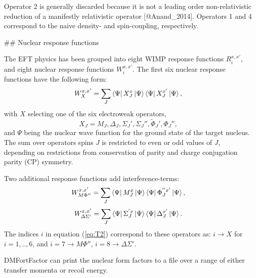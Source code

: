 Operator 2 is generally discarded because it is not a leading order
non-relativistic reduction of a manifestly relativistic operator
[@Anand_2014].  Operators 1 and 4 correspond to the naive density- and
spin-coupling, respectively.  

## Nuclear response functions

The EFT physics has been grouped into eight WIMP response functions
$R_i^{x,x'}$, and eight nuclear response functions $W_i^{x,x'}$.
The first six nuclear response functions have
the following form:
\begin{equation}
    W_{X}^{x,x'} = \sum_{J}\bra{\Psi} X^{x}_J \ket{\Psi}\bra{\Psi} X^{x'}_J \ket{\Psi},
\end{equation}
with $X$ selecting one of the six electroweak operators,
\begin{equation}
    X_J=M_J, \Delta_J, \Sigma_J', \Sigma_J'', \tilde{\Phi}_J', \Phi_J'',
\end{equation}
and $\Psi$ being the nuclear wave function for the ground state of the target
nucleus.  The sum over operators spins $J$ is restricted to even or odd values
of $J$, depending on restrictions from conservation of parity and charge
conjugation parity (CP) symmetry.

Two additional response functions add interference-terms:
\begin{equation}
W_{M\Phi''}^{x,x'} =
\sum_{J}\bra{\Psi} M_{J}^{x} \ket{\Psi}\bra{\Psi} \Phi_{J}^{''x'} \ket{\Psi},
\end{equation}
\begin{equation}
W_{\Delta\Sigma'}^{x,x'} = 
\sum_{J}\bra{\Psi} \Sigma_{J}^{'x} \ket{\Psi}\bra{\Psi} \Delta_{J}^{x'} \ket{\Psi}.
\end{equation}
The indices $i$ in equation (\ref{eq:T2}) correspond to these operators as:
$i\to X$ for $i=1,..,6$, and $i=7 \to M\Phi''$, $i=8\to \Delta\Sigma'$.

DMFortFactor can print the nuclear form factors to a file over a range of either
transfer momenta or recoil energy.

